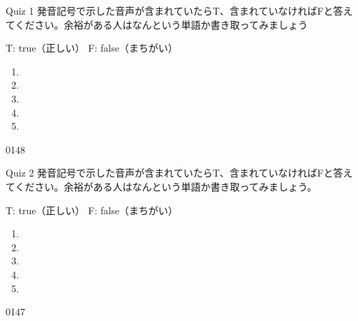 \documentclass[aspectratio=169,xcolor={dvipsnames,table}]{beamer}
\begin{document}
\begin{frame}[plain]{Quiz 1 }
\large
発音記号で示した音声が含まれていたらT、含まれていなければFと答えてください。余裕がある人はなんという単語か書き取ってみましょう

\hfill{}{\scriptsize T: true（正しい）\hspace{5pt} F: false（まちがい）}
 \begin{enumerate}
  \item \mbox{}\hspace{1\zw}
  \item \mbox{}\visible<3->{T}\hspace{1\zw}
  \item \mbox{}\hspace{1\zw}
  \item \mbox{}\hspace{1\zw}
  \item \mbox{}\hspace{1\zw}
 \end{enumerate}

\hfill{\tiny 0148}\,{\scriptsize {}}
\end{frame}
\begin{frame}[plain]{Quiz 2 }
\large
発音記号で示した音声が含まれていたらT、含まれていなければFと答えてください。余裕がある人はなんという単語か書き取ってみましょう。

\hfill{}{\scriptsize T: true（正しい）\hspace{5pt} F: false（まちがい）}
 \begin{enumerate}
  \item \mbox{}\visible<2->{F}\hspace{1\zw}
  \item \mbox{}\hspace{1\zw}
  \item \mbox{}\visible<4->{T}\hspace{1\zw}
  \item \mbox{}\hspace{1\zw}
  \item \mbox{}\hspace{1\zw}
 \end{enumerate}

\hfill{\tiny 0147}\,{\scriptsize {}}

\end{frame}
\end{document}
